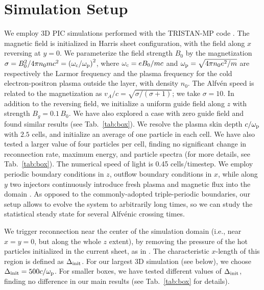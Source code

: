 \documentclass[twocolumn,twocolappendix]{aastex63}
\newcommand{\comp}{c/\omega_{\rm p}}
\newcommand{\omp}{\omega_{\rm p}}
\begin{document}
\section{Simulation Setup}\label{2}
We employ 3D PIC simulations performed with the TRISTAN-MP code \citep{buneman_93, spitkovsky_05}. The magnetic field is initialized in Harris sheet configuration, with the field along $x$ reversing at $y=0$. We parameterize the field strength $B_0$ by the magnetization $\sigma = B_0^2 / 4\pi  n_0 m c^2 = \left(\omega_{\rm c} / \omega_{\rm p}\right)^2$, where $\omega_{\rm c} = e B_0 / m c$  and $\omega_{\rm p} = \sqrt{4\pi n_0 e^2 / m}$ are respectively the Larmor frequency and the plasma frequency for the cold electron-positron plasma outside the layer, with density $n_0$. The Alfv\'{e}n speed is related to the magnetization as $v_A / c = \sqrt{\sigma/\left(\sigma + 1\right)}$; we take $\sigma = 10$. In addition to the reversing field, we initialize a uniform guide field along $z$ with strength $B_g = 0.1 \,B_0$. We have also explored a case with zero guide field and found similar results (see Tab.~\ref{tab:box}). %
We resolve the plasma skin depth $c/\omp$ with $2.5$ cells, and initialize an average of one particle in each cell. We have also tested a larger value of four particles per cell, finding no significant change in  reconnection rate, maximum energy, and particle spectra (for more details, see Tab.~\ref{tab:box}). %
The numerical speed of light is 0.45 cells/timestep. We employ periodic boundary conditions in $z$, outflow boundary conditions in $x$, while along $y$ two injectors continuously introduce fresh plasma and magnetic flux into the domain \citep[for details see][]{sironi_16,sironi_beloborodov_20}. As opposed to the commonly-adopted triple-periodic boundaries, our setup allows to evolve the system to arbitrarily long times, so we can study the statistical steady state for several Alfv\'enic crossing times. 

We trigger reconnection near the center of the simulation domain (i.e., near $x=y=0$, but along the whole $z$ extent), by removing the pressure of the hot particles initialized in the current sheet, as in \citet{sironi_16}. The characteristic $x$-length of this region is defined as $\Delta_{\rm init}$. For our largest 3D simulation (see below), we choose $\Delta_{\rm init} = 500 \comp$. For smaller boxes, we have tested different values of $\Delta_{\rm init}$, finding no difference in our main results (see Tab.~\ref{tab:box} for details). 
\end{document}

